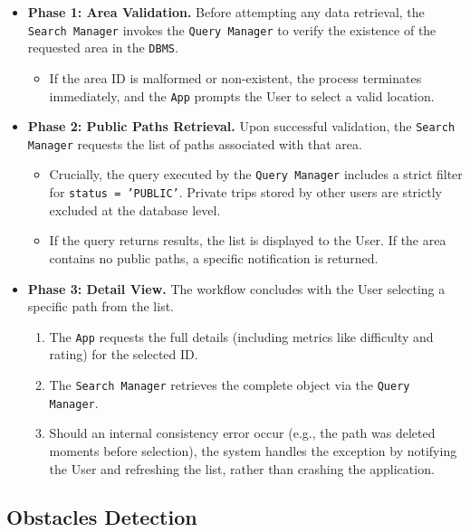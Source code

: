 \begin{itemize}
    \item \textbf{Phase 1: Area Validation.} Before attempting any data retrieval, the \texttt{Search Manager} invokes the \texttt{Query Manager} to verify the existence of the requested area in the \texttt{DBMS}.
    \begin{itemize}
        \item If the area ID is malformed or non-existent, the process terminates immediately, and the \texttt{App} prompts the User to select a valid location.
    \end{itemize}

    \item \textbf{Phase 2: Public Paths Retrieval.} Upon successful validation, the \texttt{Search Manager} requests the list of paths associated with that area.
    \begin{itemize}
        \item Crucially, the query executed by the \texttt{Query Manager} includes a strict filter for \texttt{status = 'PUBLIC'}. Private trips stored by other users are strictly excluded at the database level.
        \item If the query returns results, the list is displayed to the User. If the area contains no public paths, a specific notification is returned.
    \end{itemize}

    \item \textbf{Phase 3: Detail View.} The workflow concludes with the User selecting a specific path from the list.
    \begin{enumerate}
        \item The \texttt{App} requests the full details (including metrics like difficulty and rating) for the selected ID.
        \item The \texttt{Search Manager} retrieves the complete object via the \texttt{Query Manager}.
        \item Should an internal consistency error occur (e.g., the path was deleted moments before selection), the system handles the exception by notifying the User and refreshing the list, rather than crashing the application.
    \end{enumerate}
\end{itemize}




\subsection{Obstacles Detection}
\label{subsec:runtime_obstacles}

